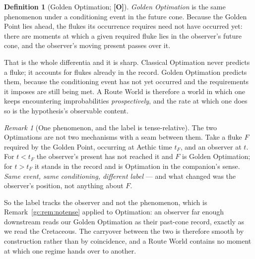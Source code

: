 \documentclass[11pt]{article}
\numberwithin{equation}{section}
\theoremstyle{plain}
\theoremstyle{definition}
\newtheorem{definition}[theorem]{Definition}
\theoremstyle{remark}
\newtheorem{remark}[theorem]{Remark}
\begin{document}
\begin{definition}[Golden Optimation; \textbf{[O]}]\label{gc:def:goldenopt}
\emph{Golden Optimation} is the same phenomenon under a conditioning
event in the future cone. Because the Golden Point lies ahead, the
flukes its occurrence requires need not have occurred yet: there are
moments at which a given required fluke lies in the observer's future
cone, and the observer's moving present passes over it.
\end{definition}

That is the whole differentia and it is sharp. Classical Optimation
never predicts a fluke; it accounts for flukes already in the record.
Golden Optimation predicts them, because the conditioning event has not
yet occurred and the requirements it imposes are still being met. A
Route World is therefore a world in which one keeps encountering
improbabilities \emph{prospectively}, and the rate at which one does so
is the hypothesis's observable content.

\begin{remark}[One phenomenon, and the label is tense-relative]
\label{gc:rem:carryover}
The two Optimations are not two mechanisms with a seam between them.
Take a fluke $F$ required by the Golden Point, occurring at Aethic time
$t_F$, and an observer at $t$. For $t<t_F$ the observer's present has not
reached it and $F$ is Golden Optimation; for $t>t_F$ it stands in the
record and is Optimation in the companion's sense. \emph{Same event, same
conditioning, different label} --- and what changed was the observer's
position, not anything about $F$.

So the label tracks the observer and not the phenomenon, which is
Remark~\ref{gc:rem:notense} applied to Optimation: an observer far enough
downstream reads our Golden Optimation as their past-cone record,
exactly as we read the Cretaceous. The carryover between the two is
therefore smooth by construction rather than by coincidence, and a Route
World contains no moment at which one regime hands over to another.
\end{remark}
\end{document}
